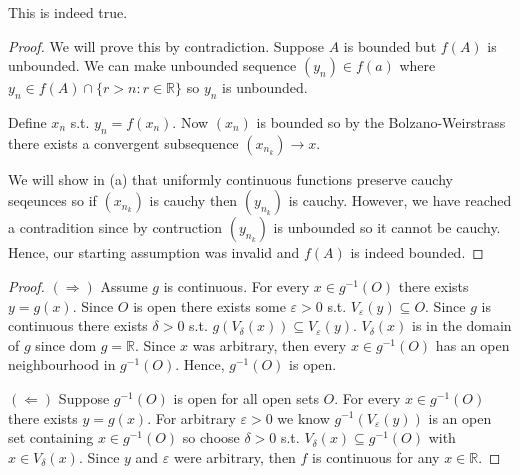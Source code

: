 This is indeed true. 
\begin{proof}
    We will prove this by contradiction. 
    Suppose $A$ is bounded but $f(A)$ is unbounded. 
    We can make unbounded sequence $(y_n)\in f(a)$
    where $y_n\in f(A)\cap \{ r>n : r\in \mathbb{R} \}$
    so $y_n$ is unbounded.

    Define $x_n$ s.t. $y_n=f(x_n)$. Now $(x_n)$ is 
    bounded so by the Bolzano-Weirstrass \Thm there exists a 
    convergent subsequence $(x_{n_k})\rightarrow x$.

    We will show in  (a) that uniformly continuous 
    functions preserve cauchy seqeunces so if 
    $(x_{n_k})$ is cauchy then $(y_{n_k})$ is cauchy. 
    However, we have reached a contradition since by 
    contruction $(y_{n_k})$ is unbounded so it cannot be 
    cauchy. Hence, our starting assumption was invalid and 
    $f(A)$ is indeed bounded.
\end{proof}


\begin{proof}
    $(\Rightarrow)$ Assume $g$ is continuous. For every $x\in g^{-1}(O)$
    there exists $y=g(x)$. Since $O$ is open there exists 
    some $\varepsilon>0$ s.t. $V_\varepsilon(y)\subseteq O$. 
    Since $g$ is continuous there exists $\delta>0$ s.t. $g(V_\delta(x)) 
    \subseteq V_\varepsilon(y)$. $V_\delta(x)$ is in the domain of 
    $g$ since $\text{dom } g=\mathbb{R}$. Since $x$ was arbitrary, then every 
    $x\in g^{-1}(O)$ has an open neighbourhood in $g^{-1}(O)$. Hence,
    $g^{-1}(O)$ is open.

    $(\Leftarrow)$ Suppose $g^{-1}(O)$ is open for all open sets $O$.
    For every $x\in g^{-1}(O)$ there exists $y=g(x)$.
    For arbitrary $\varepsilon>0$ we know 
    $g^{-1}(V_\varepsilon(y))$ is an open set containing $x\in g^{-1}(O)$
    so choose $\delta>0$ s.t. $V_\delta(x)\subseteq g^{-1}(O)$ with 
    $x \in V_\delta(x)$. Since $y$ and $\varepsilon$ were arbitrary, then 
    $f$ is continuous for any $x \in \mathbb{R}$.
\end{proof}

